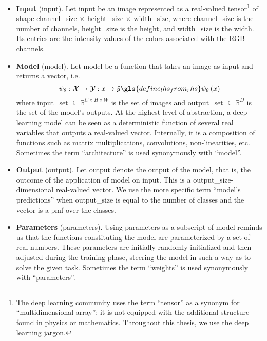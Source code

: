 \begin{itemize}
\item \textbf{Input} (\gls{input}). Let \gls{input} be an image represented as a real-valued tensor\footnote{The deep learning community uses the term ``tensor'' as a synonym for ``multidimensional array''; it is not equipped with the additional structure found in physics or mathematics. Throughout this thesis, we use the deep learning jargon.} of shape \gls{channel_size} $\times$ \gls{height_size} $\times$ \gls{width_size}, where \gls{channel_size} is the number of channels, \gls{height_size} is the height, and \gls{width_size} is the width. Its entries are the intensity values of the colors associated with the RGB channels.

\item \textbf{Model} (\gls{model}). Let \gls{model} be a function that takes an image as input and returns a vector, i.e.\
\begin{equation}
  \psi_\theta: \mathcal{X} \to \mathcal{Y}
  : x \mapsto \hat{y} \gls{define_lhs_from_rhs} \psi_\theta \left(x\right)
  \label{eq:model}
\end{equation}
where \gls{input_set} $\subseteq \mathbb{R}^{C \times H \times W}$ is the set of images and \gls{output_set} $\subseteq \mathbb{R}^{D}$ is the set of the model's outputs. At the highest level of abstraction, a deep learning model can be seen as a deterministic function of several real variables that outputs a real-valued vector. Internally, it is a composition of functions such as matrix multiplications, convolutions, non-linearities, etc. Sometimes the term ``architecture'' is used synonymously with ``model''.

\item \textbf{Output} (\gls{output}). Let \gls{output} denote the output of the model, that is, the outcome of the application of \gls{model} on \gls{input}. This is a \gls{output_size}-dimensional real-valued vector. We use the more specific term ``model's predictions'' when \gls{output_size} is equal to the number of classes and the vector is a \acrfull{pmf} over the classes.

\item \textbf{Parameters} (\gls{parameters}). Using \gls{parameters} as a subscript of \gls{model}
reminds us that the functions constituting the model are parameterized by a set of real numbers. These parameters are initially randomly initialized and then adjusted during the training phase, steering the model in such a way as to solve the given task. Sometimes the term ``weights'' is used synonymously with ``parameters''.


\end{itemize}
